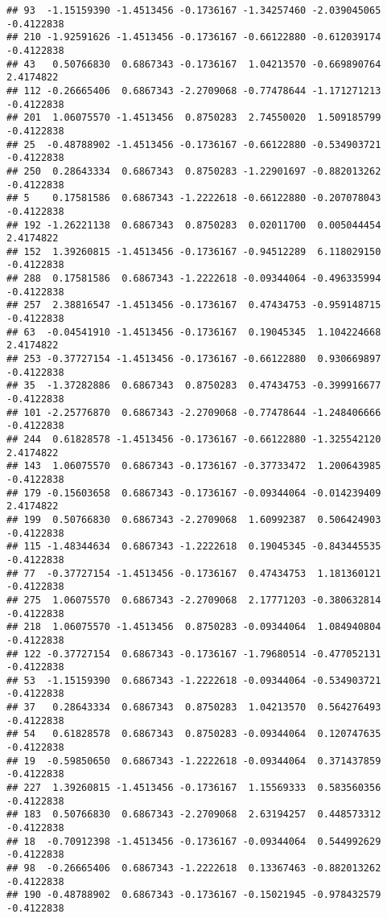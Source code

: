 \documentclass[
]{article}
\begin{document}
\begin{verbatim}
## 93  -1.15159390 -1.4513456 -0.1736167 -1.34257460 -2.039045065 -0.4122838
## 210 -1.92591626 -1.4513456 -0.1736167 -0.66122880 -0.612039174 -0.4122838
## 43   0.50766830  0.6867343 -0.1736167  1.04213570 -0.669890764  2.4174822
## 112 -0.26665406  0.6867343 -2.2709068 -0.77478644 -1.171271213 -0.4122838
## 201  1.06075570 -1.4513456  0.8750283  2.74550020  1.509185799 -0.4122838
## 25  -0.48788902 -1.4513456 -0.1736167 -0.66122880 -0.534903721 -0.4122838
## 250  0.28643334  0.6867343  0.8750283 -1.22901697 -0.882013262 -0.4122838
## 5    0.17581586  0.6867343 -1.2222618 -0.66122880 -0.207078043 -0.4122838
## 192 -1.26221138  0.6867343  0.8750283  0.02011700  0.005044454  2.4174822
## 152  1.39260815 -1.4513456 -0.1736167 -0.94512289  6.118029150 -0.4122838
## 288  0.17581586  0.6867343 -1.2222618 -0.09344064 -0.496335994 -0.4122838
## 257  2.38816547 -1.4513456 -0.1736167  0.47434753 -0.959148715 -0.4122838
## 63  -0.04541910 -1.4513456 -0.1736167  0.19045345  1.104224668  2.4174822
## 253 -0.37727154 -1.4513456 -0.1736167 -0.66122880  0.930669897 -0.4122838
## 35  -1.37282886  0.6867343  0.8750283  0.47434753 -0.399916677 -0.4122838
## 101 -2.25776870  0.6867343 -2.2709068 -0.77478644 -1.248406666 -0.4122838
## 244  0.61828578 -1.4513456 -0.1736167 -0.66122880 -1.325542120  2.4174822
## 143  1.06075570  0.6867343 -0.1736167 -0.37733472  1.200643985 -0.4122838
## 179 -0.15603658  0.6867343 -0.1736167 -0.09344064 -0.014239409  2.4174822
## 199  0.50766830  0.6867343 -2.2709068  1.60992387  0.506424903 -0.4122838
## 115 -1.48344634  0.6867343 -1.2222618  0.19045345 -0.843445535 -0.4122838
## 77  -0.37727154 -1.4513456 -0.1736167  0.47434753  1.181360121 -0.4122838
## 275  1.06075570  0.6867343 -2.2709068  2.17771203 -0.380632814 -0.4122838
## 218  1.06075570 -1.4513456  0.8750283 -0.09344064  1.084940804 -0.4122838
## 122 -0.37727154  0.6867343 -0.1736167 -1.79680514 -0.477052131 -0.4122838
## 53  -1.15159390  0.6867343 -1.2222618 -0.09344064 -0.534903721 -0.4122838
## 37   0.28643334  0.6867343  0.8750283  1.04213570  0.564276493 -0.4122838
## 54   0.61828578  0.6867343  0.8750283 -0.09344064  0.120747635 -0.4122838
## 19  -0.59850650  0.6867343 -1.2222618 -0.09344064  0.371437859 -0.4122838
## 227  1.39260815 -1.4513456 -0.1736167  1.15569333  0.583560356 -0.4122838
## 183  0.50766830  0.6867343 -2.2709068  2.63194257  0.448573312 -0.4122838
## 18  -0.70912398 -1.4513456 -0.1736167 -0.09344064  0.544992629 -0.4122838
## 98  -0.26665406  0.6867343 -1.2222618  0.13367463 -0.882013262 -0.4122838
## 190 -0.48788902  0.6867343 -0.1736167 -0.15021945 -0.978432579 -0.4122838

\end{verbatim}
\end{document}
